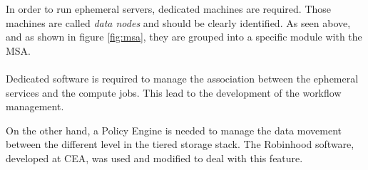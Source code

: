 In order to run ephemeral servers, dedicated machines are required. Those machines are called \textit{data nodes}
and should be clearly identified. As seen above, and as shown in figure \ref{fig:msa}, they are grouped into
a specific module with the MSA. 

\paragraph{}
Dedicated software is required to manage the association between the ephemeral services and the compute jobs. 
This lead to the development of the workflow management.

On the other hand, a Policy Engine is needed to manage the data movement between the different level in the
tiered storage stack. The Robinhood software, developed at CEA, was used and modified to deal with this feature.

